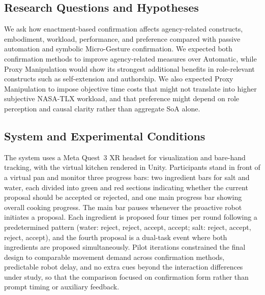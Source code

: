 \documentclass[sigconf,review,anonymous]{acmart}
\begin{document}
\subsection{Research Questions and Hypotheses}
We ask how enactment-based confirmation affects agency-related constructs, embodiment, workload, performance, and preference compared with passive automation and symbolic Micro-Gesture confirmation. We expected both confirmation methods to improve agency-related measures over Automatic, while Proxy Manipulation would show its strongest additional benefits in role-relevant constructs such as self-extension and authorship. We also expected Proxy Manipulation to impose objective time costs that might not translate into higher subjective NASA-TLX workload, and that preference might depend on role perception and causal clarity rather than aggregate SoA alone.
\subsection{System and Experimental Conditions}
The system uses a Meta Quest~3 XR headset for visualization and bare-hand tracking, with the virtual kitchen rendered in Unity. Participants stand in front of a virtual pan and monitor three progress bars: two ingredient bars for salt and water, each divided into green and red sections indicating whether the current proposal should be accepted or rejected, and one main progress bar showing overall cooking progress. The main bar pauses whenever the proactive robot initiates a proposal. Each ingredient is proposed four times per round following a predetermined pattern (water: reject, reject, accept, accept; salt: reject, accept, reject, accept), and the fourth proposal is a dual-task event where both ingredients are proposed simultaneously. Pilot iterations constrained the final design to comparable movement demand across confirmation methods, predictable robot delay, and no extra cues beyond the interaction differences under study, so that the comparison focused on confirmation form rather than prompt timing or auxiliary feedback.
\end{document}
